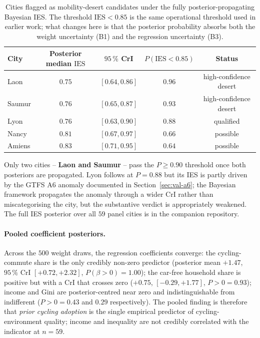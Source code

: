 \documentclass[11pt,a4paper]{article}
\newcommand{\IES}{\mathrm{IES}}
\begin{document}
\begin{table}[H]
\centering
\caption{Cities flagged as mobility-desert candidates under the
fully posterior-propagating Bayesian IES. The threshold
$\IES < 0.85$ is the same operational threshold used in earlier
work; what changes here is that the posterior probability
absorbs both the weight uncertainty (B1) and the regression
uncertainty (B3).}
\label{tab:ies-bayes}
\small
\begin{tabular}{@{}lcccc@{}}
\toprule
City & Posterior median $\IES$ & $95\,\%$ CrI & $P(\IES < 0.85)$ & Status \\
\midrule
Laon         & $0.75$ & $[0.64, 0.86]$ & $0.96$ & high-confidence desert \\
Saumur       & $0.76$ & $[0.65, 0.87]$ & $0.93$ & high-confidence desert \\
Lyon         & $0.76$ & $[0.63, 0.90]$ & $0.88$ & qualified \\
Nancy        & $0.81$ & $[0.67, 0.97]$ & $0.66$ & possible \\
Amiens       & $0.83$ & $[0.71, 0.95]$ & $0.64$ & possible \\
\bottomrule
\end{tabular}
\end{table}

Only two cities -- \textbf{Laon and Saumur} -- pass the
$P \geq 0.90$ threshold once both posteriors are propagated. Lyon
follows at $P = 0.88$ but its IES is partly driven by the GTFS
A6 anomaly documented in Section~\ref{sec:val-a6}; the Bayesian
framework propagates the anomaly through a wider CrI rather than
miscategorising the city, but the substantive verdict is
appropriately weakened. The full IES posterior over all $59$
panel cities is in the companion repository.

\paragraph{Pooled coefficient posteriors.}
Across the $500$ weight draws, the regression coefficients
converge: the cycling-commute share is the only credibly
non-zero predictor (posterior mean $+1.47$, $95\,\%$ CrI
$[+0.72, +2.32]$, $P(\beta > 0) = 1.00$); the car-free household
share is positive but with a CrI that crosses zero ($+0.75$,
$[-0.29, +1.77]$, $P > 0 = 0.93$); income and Gini are
posterior-centred near zero and indistinguishable from
indifferent ($P > 0 = 0.43$ and $0.29$ respectively). The
pooled finding is therefore that \emph{prior cycling adoption}
is the single empirical predictor of cycling-environment
quality; income and inequality are not credibly correlated with
the indicator at $n = 59$.
\end{document}
